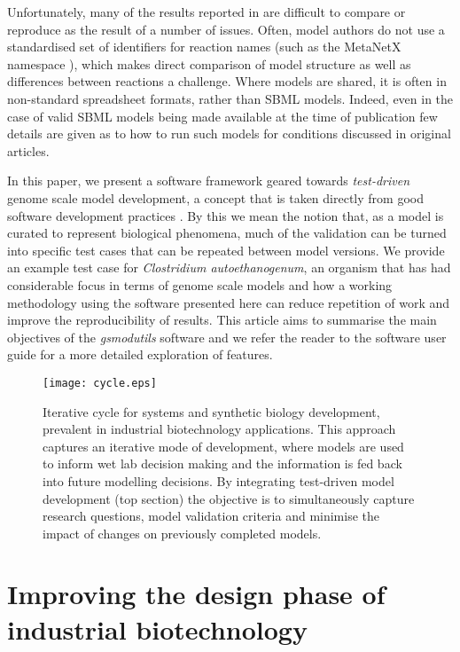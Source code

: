 \documentclass[journal=asbcd6]{achemso}
\begin{document}
Unfortunately, many of the results reported in \cite{lee2008genome, senger2008genome, mcanulty2012genome, dash2014capturing, yoo2015quantitative} are difficult to compare or reproduce as the result of a number of issues.
Often, model authors do not use a standardised set of identifiers for reaction names (such as the MetaNetX namespace \cite{moretti2016metanetx}), which makes direct comparison of model structure as well as differences between reactions a challenge.
Where models are shared, it is often in non-standard spreadsheet formats, rather than SBML models.
Indeed, even in the case of valid SBML models being made available at the time of publication few details are given as to how to run such models for conditions discussed in original articles.

In this paper, we present a software framework geared towards \textit{test-driven} genome scale model development, a concept that is taken directly from good software development practices \cite{martin2002agile}.
By this we mean the notion that, as a model is curated to represent biological phenomena, much of the validation can be turned into specific test cases that can be repeated between model versions.
We provide an example test case for \textit{Clostridium autoethanogenum}, an organism that has had considerable focus in terms of genome scale models and how a working methodology using the software presented here can reduce repetition of work and improve the reproducibility of results.
This article aims to summarise the main objectives of the \textit{gsmodutils} software and we refer the reader to the software user guide for a more detailed exploration of features.

\begin{figure}[ht]
 \texttt{[image: cycle.eps]}
 \caption{Iterative cycle for systems and synthetic biology development, prevalent in industrial biotechnology applications.
This approach captures an iterative mode of development, where models are used to inform wet lab decision making and the information is fed back into future modelling decisions.
By integrating test-driven model development (top section) the objective is to simultaneously capture research questions, model validation criteria and minimise the impact of changes on previously completed models.
 }
 \label{fig:cycle}
 \end{figure}

\section{Improving the design phase of industrial biotechnology}
\end{document}
